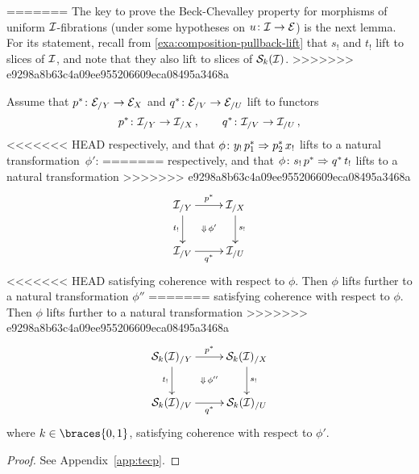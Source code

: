 \documentclass[reqno,10pt,a4paper,oneside,draft]{amsart}
\begin{document}
=======
The key to prove the Beck-Chevalley property for morphisms of uniform $\cal{I}$-fibrations (under some hypotheses on $u \co \cal{I} \to \cal{E}$)
is the next lemma.  For its statement, recall from \cref{exa:composition-pullback-lift} that $s_!$ and $t_!$ lift 
to slices of $\cal{I}$, and note that they also lift to slices of $\cal{S}_k(\cal{I})$. 
>>>>>>> e9298a8b63c4a09ee955206609eca08495a3468a


\begin{lemma} \label{strong-h-equiv-base-change-along-fibration-BC}
Assume that $p^* \co \cal{E}_{/Y} \to \cal{E}_{X}$ and $q^* \co \cal{E}_{/V} \to \cal{E}_{/U}$ lift to functors
\[
  p^* \co \cal{I}_{/Y} \to \cal{I}_{/X}
\, , \qquad
  q^* \co \cal{I}_{/V} \to \cal{I}_{/U}
\, ,
\]
<<<<<<< HEAD
respectively, and that $\phi \co y_! \, p_1^* \Rightarrow p_2^* \, x_{!}$ lifts to a natural transformation~$\phi'$:
=======
respectively, and that  $\phi \co s_! \, p^* \Rightarrow q^* \, t_{!}$ lifts to a natural transformation
>>>>>>> e9298a8b63c4a09ee955206609eca08495a3468a
\begin{equation} \label{strong-h-equiv-base-change-along-fibration-BC:2}
\begin{gathered}
\xymatrix{
  \cal{I}_{/Y}
  \ar[r]^{p^*}
  \ar[d]_{t_!}
  \ar@{}[dr]|{\Downarrow \, \phi'}
&
  \cal{I}_{/X}
  \ar[d]^{s_!}
\\
  \cal{I}_{/V}
  \ar[r]_{q^*}
&
  \cal{I}_{/U}
}
\end{gathered}
\end{equation}
<<<<<<< HEAD
satisfying coherence with respect to $\phi$.
Then $\phi$ lifts further to a natural transformation $\phi''$
=======
satisfying coherence with respect to $\phi$. 
Then $\phi$ lifts further to a natural transformation 
>>>>>>> e9298a8b63c4a09ee955206609eca08495a3468a
\begin{equation} \label{strong-h-equiv-base-change-along-fibration-BC:3}
\begin{gathered}
\xymatrix{
  \cal{S}_k(\cal{I})_{/Y}
  \ar[r]^{p^*}
  \ar[d]_{t_!}
  \ar@{}[dr]|{\Downarrow \, \phi''}
&
  \cal{S}_k(\cal{I})_{/X}
  \ar[d]^{s_!}
\\
  \cal{S}_k(\cal{I})_{/V}
  \ar[r]_{q^*}
&
  \cal{S}_k(\cal{I})_{/U}
}
\end{gathered}
\end{equation}
where $k \in \braces{0, 1}$, satisfying coherence with respect to $\phi'$.
\end{lemma}

\begin{proof}
See Appendix~\ref{app:tecp}.
\end{proof}
\end{document}
